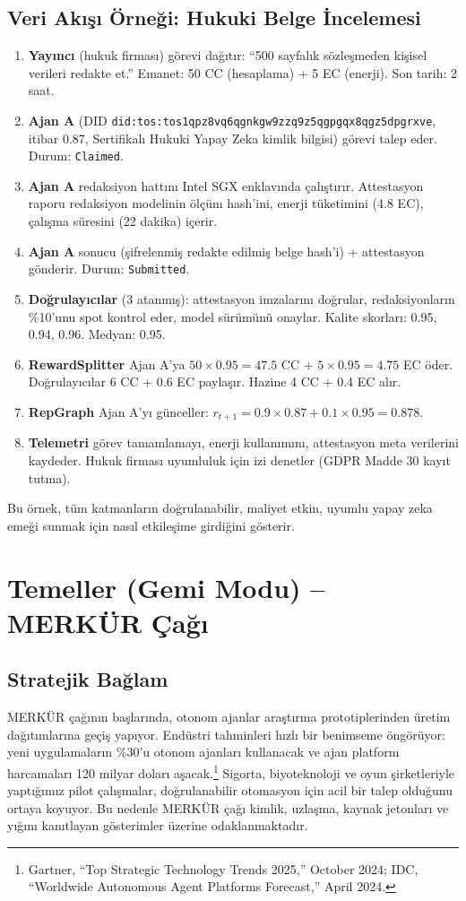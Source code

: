 \documentclass[11pt]{article}
\begin{document}
\subsection{Veri Akışı Örneği: Hukuki Belge İncelemesi}
\begin{enumerate}[label=\arabic*.]
  \item \textbf{Yayıncı} (hukuk firması) görevi dağıtır: ``500 sayfalık sözleşmeden kişisel verileri redakte et.'' Emanet: 50 CC (hesaplama) + 5 EC (enerji). Son tarih: 2 saat.
  \item \textbf{Ajan A} (DID \texttt{did:tos:tos1qpz8vq6qgnkgw9zzq9z5qgpgqx8qgz5dpgrxve}, itibar 0.87, Sertifikalı Hukuki Yapay Zeka kimlik bilgisi) görevi talep eder. Durum: \texttt{Claimed}.
  \item \textbf{Ajan A} redaksiyon hattını Intel SGX enklavında çalıştırır. Attestasyon raporu redaksiyon modelinin ölçüm hash'ini, enerji tüketimini (4.8 EC), çalışma süresini (22 dakika) içerir.
  \item \textbf{Ajan A} sonucu (şifrelenmiş redakte edilmiş belge hash'i) + attestasyon gönderir. Durum: \texttt{Submitted}.
  \item \textbf{Doğrulayıcılar} (3 atanmış): attestasyon imzalarını doğrular, redaksiyonların \%10'unu spot kontrol eder, model sürümünü onaylar. Kalite skorları: 0.95, 0.94, 0.96. Medyan: 0.95.
  \item \textbf{RewardSplitter} Ajan A'ya $50 \times 0.95 = 47.5$ CC + $5 \times 0.95 = 4.75$ EC öder. Doğrulayıcılar 6 CC + 0.6 EC paylaşır. Hazine 4 CC + 0.4 EC alır.
  \item \textbf{RepGraph} Ajan A'yı günceller: $r_{t+1} = 0.9 \times 0.87 + 0.1 \times 0.95 = 0.878$.
  \item \textbf{Telemetri} görev tamamlamayı, enerji kullanımını, attestasyon meta verilerini kaydeder. Hukuk firması uyumluluk için izi denetler (GDPR Madde 30 kayıt tutma).
\end{enumerate}

Bu örnek, tüm katmanların doğrulanabilir, maliyet etkin, uyumlu yapay zeka emeği sunmak için nasıl etkileşime girdiğini gösterir.

\section{Temeller (Gemi Modu) -- MERKÜR Çağı}
\subsection{Stratejik Bağlam}
MERKÜR çağının başlarında, otonom ajanlar araştırma prototiplerinden üretim dağıtımlarına geçiş yapıyor. Endüstri tahminleri hızlı bir benimseme öngörüyor: yeni uygulamaların \%30'u otonom ajanları kullanacak ve ajan platform harcamaları 120 milyar doları aşacak.\footnote{Gartner, ``Top Strategic Technology Trends 2025,'' October 2024; IDC, ``Worldwide Autonomous Agent Platforms Forecast,'' April 2024.} Sigorta, biyoteknoloji ve oyun şirketleriyle yaptığımız pilot çalışmalar, doğrulanabilir otomasyon için acil bir talep olduğunu ortaya koyuyor. Bu nedenle MERKÜR çağı kimlik, uzlaşma, kaynak jetonları ve yığını kanıtlayan gösterimler üzerine odaklanmaktadır.
\end{document}
